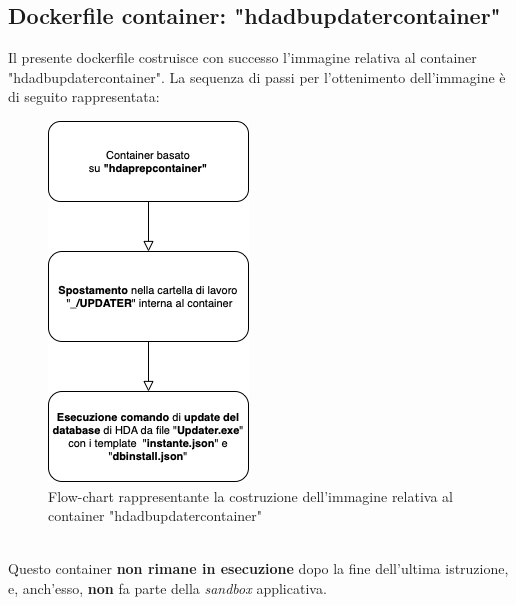 \subsection{Dockerfile container: "hdadbupdatercontainer"}
Il presente dockerfile costruisce con successo l'immagine relativa al container "hdadbupdatercontainer". La sequenza di passi per l'ottenimento dell'immagine è di seguito rappresentata:
\begin{figure}[!h]     
\centering 
    \includegraphics[width=0.3\columnwidth]{immagini/flowchart/flowchart_hdadbinstall} 
    \caption{Flow-chart rappresentante la costruzione dell'immagine relativa al container "hdadbupdatercontainer"}
\end{figure} \\
Questo container \textbf{non rimane in esecuzione} dopo la fine dell'ultima istruzione, e, anch'esso, \textbf{non} fa parte della \textit{sandbox} applicativa.\\
\newpage

